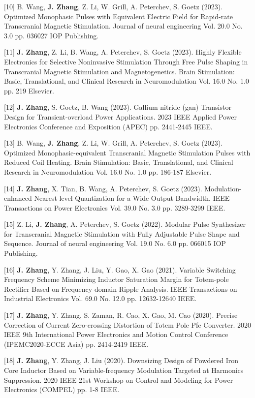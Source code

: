 [10] B. Wang, \textbf{J. Zhang}, Z. Li, W. Grill, A. Peterchev, S. Goetz (2023). Optimized Monophasic Pulses with Equivalent Electric Field for Rapid-rate Transcranial Magnetic Stimulation. Journal of neural engineering Vol. 20.0 No. 3.0 pp. 036027 IOP Publishing.

[11] \textbf{J. Zhang}, Z. Li, B. Wang, A. Peterchev, S. Goetz (2023). Highly Flexible Electronics for Selective Noninvasive Stimulation Through Free Pulse Shaping in Transcranial Magnetic Stimulation and Magnetogenetics. Brain Stimulation: Basic, Translational, and Clinical Research in Neuromodulation Vol. 16.0 No. 1.0 pp. 219 Elsevier.

[12] \textbf{J. Zhang}, S. Goetz, B. Wang (2023). Gallium-nitride (gan) Transistor Design for Transient-overload Power Applications. 2023 IEEE Applied Power Electronics Conference and Exposition (APEC)   pp. 2441-2445 IEEE.

[13] B. Wang, \textbf{J. Zhang}, Z. Li, W. Grill, A. Peterchev, S. Goetz (2023). Optimized Monophasic-equivalent Transcranial Magnetic Stimulation Pulses with Reduced Coil Heating. Brain Stimulation: Basic, Translational, and Clinical Research in Neuromodulation Vol. 16.0 No. 1.0 pp. 186-187 Elsevier.

[14] \textbf{J. Zhang}, X. Tian, B. Wang, A. Peterchev, S. Goetz (2023). Modulation-enhanced Nearest-level Quantization for a Wide Output Bandwidth. IEEE Transactions on Power Electronics Vol. 39.0 No. 3.0 pp. 3289-3299 IEEE.

[15] Z. Li, \textbf{J. Zhang}, A. Peterchev, S. Goetz (2022). Modular Pulse Synthesizer for Transcranial Magnetic Stimulation with Fully Adjustable Pulse Shape and Sequence. Journal of neural engineering Vol. 19.0 No. 6.0 pp. 066015 IOP Publishing.

[16] \textbf{J. Zhang}, Y. Zhang, J. Liu, Y. Gao, X. Gao (2021). Variable Switching Frequency Scheme Minimizing Inductor Saturation Margin for Totem-pole Rectifier Based on Frequency-domain Ripple Analysis. IEEE Transactions on Industrial Electronics Vol. 69.0 No. 12.0 pp. 12632-12640 IEEE.

[17] \textbf{J. Zhang}, Y. Zhang, S. Zaman, R. Cao, X. Gao, M. Cao (2020). Precise Correction of Current Zero-crossing Distortion of Totem Pole Pfc Converter. 2020 IEEE 9th International Power Electronics and Motion Control Conference (IPEMC2020-ECCE Asia)   pp. 2414-2419 IEEE.

[18] \textbf{J. Zhang}, Y. Zhang, J. Liu (2020). Downsizing Design of Powdered Iron Core Inductor Based on Variable-frequency Modulation Targeted at Harmonics Suppression. 2020 IEEE 21st Workshop on Control and Modeling for Power Electronics (COMPEL)   pp. 1-8 IEEE.

